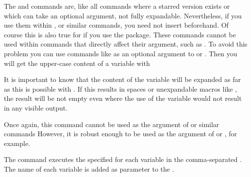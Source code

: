 \begin{Declaration}
\end{Declaration}
The  and 
commands are, like all commands where a starred version exists or which can
take an optional argument, not fully expandable. Nevertheless, if you use them
within ,
 or similar commands, you
need not insert  beforehand. Of course
this is also true for
 if you use the
\hyperref[cha:scrlayer-scrpage]{}%
 package. These commands
cannot be used within commands that directly affect their argument, such as
%
. To avoid this problem you can use commands like
 as an optional argument to  or
. Then you will get the upper-case content of a variable
with
\begin{lstcode}[escapeinside=`']
\end{lstcode}
%
\EndIndexGroup


\begin{Declaration}
\end{Declaration}
It is important to know that the content of the variable will be expanded as
far as this is possible with . If this results in spaces or
unexpandable macros like , the result will be not empty even
where the use of the variable would not result in any visible output.

Once again, this command cannot be used as the argument
of  or similar commands However,
it is robust enough to be used as the argument of
 or , for
example.%
%
\EndIndexGroup


\begin{Declaration}
\end{Declaration}
The 
 command executes the specified  for each
variable in the comma-separated . The name of each
variable is added as parameter to the .%

